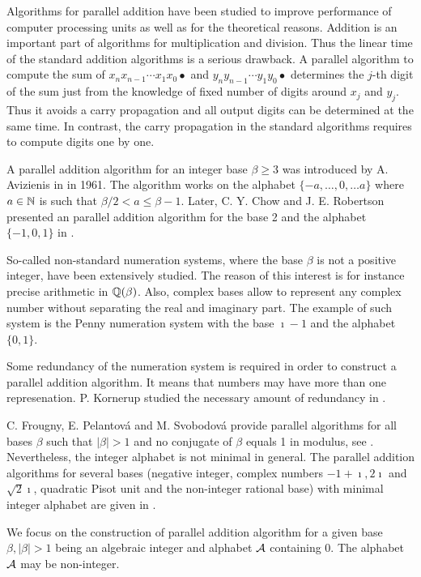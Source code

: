 Algorithms for parallel addition have been studied to improve performance of computer processing units as well as for the theoretical reasons. Addition is an important part of algorithms for multiplication and division. Thus the linear time of the standard addition algorithms is a serious drawback. A parallel algorithm to compute the sum of $x_n x_{n-1}\cdots x_1 x_0 \bullet$ and $y_n y_{n-1}\cdots y_1 y_0 \bullet$ determines the $j$-th digit of the sum just from the knowledge of fixed number of digits around $x_j$ and $y_j$. Thus it avoids a carry propagation and all output digits can be determined at the same time. In contrast, the carry propagation in the standard algorithms requires to compute digits one by one.

A parallel addition algorithm for an integer base $\beta\geq3$ was introduced by A. Avizienis in \cite{avizienis} in 1961. The algorithm works on the alphabet $\{-a, \dots, 0, \dots a\}$ where $a\in\mathbb{N}$ is such that $\beta/2 <a \leq \beta-1$. Later, C. Y. Chow and J. E. Robertson presented an parallel addition algorithm for the base 2 and the alphabet $\{-1,0,1\}$ in \cite{chow}.   

So-called non-standard numeration systems, where the base $\beta$ is not a positive integer, have been extensively studied. The reason of this interest is for instance precise arithmetic in $\mathbb{Q}(\beta)$. Also, complex bases allow to represent any complex number without separating the real and imaginary part. The example of such system is the Penny numeration system with the base $\imath -1$ and the alphabet $\{0,1\}$.

Some redundancy of the numeration system is required in order to construct a parallel addition algorithm. It means that numbers may have more than one represenation. P. Kornerup studied the necessary amount of redundancy in \cite{kornerup}. 

C. Frougny, E. Pelantov\'a and M. Svobodov\'a provide parallel algorithms for all bases $\beta$ such that $|\beta|>1$ and no conjugate of $\beta$ equals 1 in modulus, see \cite{parAddNS}. Nevertheless, the integer alphabet is not minimal in general.
 The parallel addition algorithms for several bases (negative integer, complex numbers $-1+\imath, 2\imath$ and $\sqrt{2}\imath$, quadratic Pisot unit and the non-integer rational base) with minimal integer alphabet are given in \cite{minAlph}.
 

We focus on the construction of parallel addition algorithm for a given base $\beta, |\beta|>1$ being an algebraic integer and alphabet $\mathcal{A}$ containing 0. The alphabet $\mathcal{A}$ may be non-integer. 

